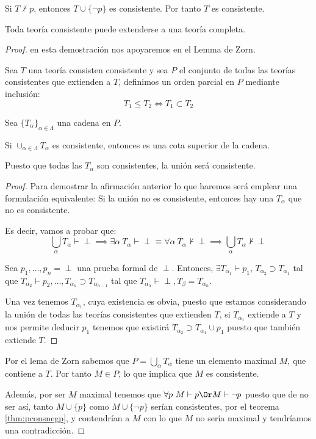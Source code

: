 \documentclass{apuntes}
\begin{document}
\begin{theorem}
	Si $T \nvdash p$, entonces $T\cup \{\neg p\}$ es consistente. Por tanto $T$ es consistente.
	\label{thm:pconsnegp}
\end{theorem}

\begin{theorem}
	Toda teoría consistente puede extenderse a una teoría completa.
	\label{thm:lindenbaum}
\end{theorem}
\begin{proof}
	en esta demostración nos apoyaremos en el Lemma de Zorn. 

	Sea $T$ una teoría consisten consistente y sea $P$ el conjunto de todas las teorías consistentes que extienden a $T$, definimos un orden parcial en $P$ mediante inclusión:
	\[T_1\le T_2 \iff T_1\subset T_2\]

	Sea $\{T_\alpha\}_{\alpha\in\Lambda}$ una cadena en $P$.

	Si $\cup_{\alpha\in\Lambda} T_\alpha$ es consistente, entonces es una cota superior de la cadena. 

	Puesto que todas las $T_\alpha$ son consistentes, la unión será consistente.
	\begin{proof}
	Para demostrar la afirmación anterior lo que haremos será emplear una formulación equivalente: Si la unión no es consistente, entonces hay una $T_α$ que no es consistente.

	Es decir, vamos a probar que:
	\[\bigcup_α T_α \vdash \perp \implies \exists α \ T_α \vdash \perp \equiv \forall α \ T_α \nvdash \perp \implies \bigcup_αT_α \nvdash \perp\]

	Sea $p_1,\hdots,p_n = \perp$ una prueba formal de $\perp$. Entonces, $\exists T_{\alpha_1}\vdash p_1$, $T_{\alpha_2} \supset T_{\alpha_1}$ tal que $T_{\alpha_2}\vdash p_2, \hdots, T_{\alpha_n}\supset T_{\alpha_{n-1}}$ tal que $T_{\alpha_n}\vdash \perp, T_\beta = T_{\alpha_n}$.

	\obs Una vez tenemos $T_{α_1}$, cuya existencia es obvia, puesto que estamos considerando la unión de todas las teorías consistentes que extienden $T$, si $T_{α_1}$ extiende a $T$ y nos permite deducir $p_1$ tenemos que existirá $T_{α_2} \supset T_{α_1} \cup p_1$ puesto que también extiende $T$.
	\end{proof}

	Por el lema de Zorn sabemos que $P=\bigcup_αT_α$ tiene un elemento maximal $M$, que contiene a $T$. Por tanto $M\in P$, lo que implica que $M$ es consistente.

	Además, por ser $M$ maximal tenemos que $\forall p \ M \vdash p \Or M \vdash \neg p$ puesto que de no ser así, tanto $M\cup\{p\}$ como $M\cup\{\neg p\}$ serían consistentes, por el teorema \ref{thm:pconsnegp}, y contendrían a $M$ con lo que $M$ no sería maximal y tendríamos una contradicción.
\end{proof}
\end{document}

